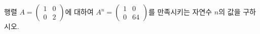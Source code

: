 행렬 $A=\begin{pmatrix} 1 & 0 \\ 0 & 2 \end{pmatrix}$에 대하여 $A^n=\begin{pmatrix} 1 & 0 \\ 0 & 64 \end{pmatrix}$를 만족시키는 자연수 $n$의 값을 구하시오.
